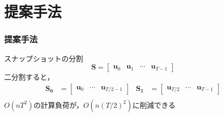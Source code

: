 \documentclass[aspectratio=169,dvipdfmx,hyperref={bookmarks=true}]{beamer}
\begin{document}
\section{提案手法}
\begin{frame}
\frametitle{提案手法}
\begin{block}{スナップショットの分割}
 \[ \bm{S} = 
        		\begin{bmatrix}
   \bm{u}_0 & \bm{u}_1 &\cdots  & \bm{u}_{T-1}
\end{bmatrix}
\]
二分割すると，
\begin{align*}
	\bm{S_0} 		&= \begin{bmatrix}\bm{u}_0 &\cdots  & \bm{u}_{T/2-1}\end{bmatrix}		&\bm{S_1} 	&= \begin{bmatrix} \bm{u}_{T/2}  &\cdots  & \bm{u}_{T-1}\end{bmatrix}\\
\end{align*}
$O(nT^2)$の計算負荷が，$O(n(T/2)^2)$に削減できる
\end{block}
 \end{frame}

  
\end{document}
